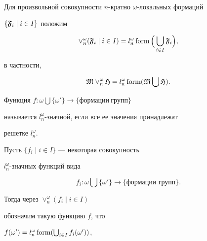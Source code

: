




Для произвольной совокупности $n$-кратно $\omega$-локальных формаций


$\{_i\mid i\in I\}$ положим


$$


\vee_n^{\omega}(\frak{F}_i\mid i\in I)=


l_n^{\omega}\form \Big(\bigcup_{i\in I}\frak{F}_i\Big),


$$


в частности,


$$


\frak{M}\vee_n^{\omega}\frak{H}=


l_n^{\omega}\form (\frak{M}\bigcup\frak{H}).


$$





Функция $f:\omega\bigcup\{\omega'\}\to\{формации\ групп\}$


называется $l_n^{\omega}$-значной, если все ее значения принадлежат


решетке $l_n^{\omega}$.





Пусть $\{f_i\mid i\in I\}$ --- некоторая совокупность


$l_n^{\omega}$-значных функций вида


$$


f_i:\omega\bigcup\{\omega'\}\to\{\text{формации\ групп}\}.


$$


Тогда через $\vee_n^{\omega}(f_i\mid i\in I)$


обозначим такую функцию $f$, что


$f(\omega')=l_n^{\omega}\operatorname{form} (\bigcup_{i\in I}f_i(\omega'))$,



